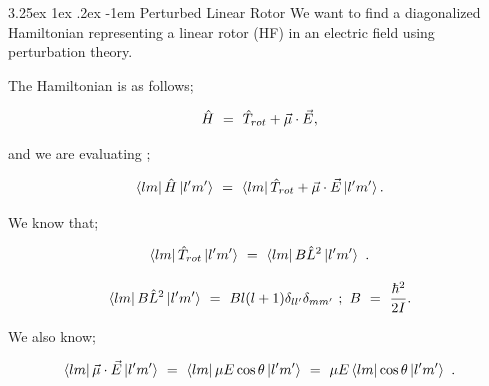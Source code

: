 \documentclass{article}
\makeatletter
\renewcommand\subparagraph{\@startsection{subparagraph}{6}{\parindent}%
  {3.25ex \@plus1ex \@minus .2ex}%
  {-1em}%
  {\normalfont\normalsize\bfseries}}
\makeatother
\begin{document}
\subparagraph{Perturbed Linear Rotor}
We want to find a diagonalized Hamiltonian representing a linear rotor (HF) in an electric field using perturbation theory. 

The Hamiltonian is as follows;

\begin{equation} \label{eb-eq-256-109}
\hat{H} \hspace{0.125cm} = \hspace{0.125cm} \hat{T}_{rot} + \vec\mu\cdot\vec{E} \hspace{0.0125cm} , 
\end{equation}

and we are evaluating ; 

\begin{equation} \label{eb-eq-257-1}
\bra{l m}\hat{H}\ket{l' m'} \hspace{0.125cm} = \hspace{0.125cm} \bra{l m} \hat{T}_{rot} + \vec\mu\cdot\vec{E}\ket{l' m'} . 
\end{equation}

We know that;

\begin{equation} \label{eb-eq-258-1}
\bra{l m}\hat{T}_{rot}\ket{l' m'} \hspace{0.125cm} = \hspace{0.125cm} \bra{l m}B\hat{L}^{2}\ket{l' m'} \hspace{0.125cm} .
\end{equation}

\begin{equation} \label{eb-eq-259-1}
\bra{l m}B\hat{L}^{2}\ket{l' m'} \hspace{0.125cm} = \hspace{0.125cm} Bl(l+1) \delta_{l l'}\delta_{m m'} \hspace{0.125cm} ; \hspace{0.125cm} B \hspace{0.125cm} = \hspace{0.125cm} \frac{\hbar^{2}}{2I} .
\end{equation}

We also know;

\begin{equation} \label{eb-eq-260-1}
\bra{l m}\vec{\mu}\cdot\vec{E}\ket{l' m'} \hspace{0.125cm} = \hspace{0.125cm} \bra{l m}\mu E\cos\theta\ket{l' m'} \hspace{0.125cm} = \hspace{0.125cm} \mu E\bra{l m}\cos\theta\ket{l' m'} \hspace{0.125cm}.
\end{equation}
\end{document}
